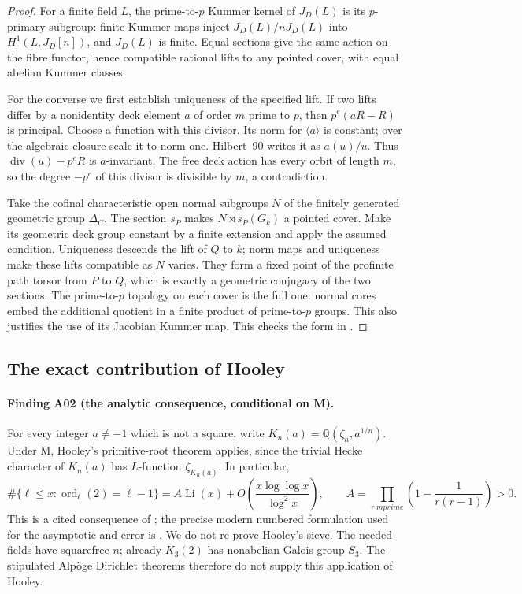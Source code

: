 \begin{proof}
For a finite field $L$, the prime-to-$p$ Kummer kernel of $J_D(L)$ is its
$p$-primary subgroup: finite Kummer maps inject $J_D(L)/nJ_D(L)$ into
$H^1(L,J_D[n])$, and $J_D(L)$ is finite. Equal sections give the same
action on the fibre functor, hence compatible rational lifts to any
pointed cover, with equal abelian Kummer classes.

For the converse we first establish uniqueness of the specified lift.
If two lifts differ by a nonidentity deck element $a$ of order $m$ prime
to $p$, then $p^e(aR-R)$ is principal. Choose a function with this
divisor. Its norm for $\langle a\rangle$ is constant; over the algebraic
closure scale it to norm one. Hilbert~90 writes it as $a(u)/u$.
Thus $\operatorname{div}(u)-p^eR$ is $a$-invariant. The free deck action
has every orbit of length $m$, so the degree $-p^e$ of this divisor is
divisible by $m$, a contradiction.

Take the cofinal characteristic open normal subgroups $N$ of the finitely
generated geometric group $\Delta_C$. The section $s_P$ makes
$N\rtimes s_P(G_k)$ a pointed cover. Make its geometric deck group
constant by a finite extension and apply the assumed condition.
Uniqueness descends the lift of $Q$ to $k$; norm maps and uniqueness
make these lifts compatible as $N$ varies. They form a fixed point of
the profinite path torsor from $P$ to $Q$, which is exactly a geometric
conjugacy of the two sections. The prime-to-$p$ topology on each cover
is the full one: normal cores embed the additional quotient in a finite
product of prime-to-$p$ groups. This also justifies the use of its
Jacobian Kummer map. This checks the form in \cite[A.31]{A1run}.
\end{proof}

\subsection{The exact contribution of Hooley}

\paragraph{Finding A02 (the analytic consequence, conditional on M).}
For every integer $a\ne-1$ which is not a square, write
$K_n(a)=\mathbb Q(\zeta_n,a^{1/n})$. Under M, Hooley's primitive-root
theorem applies, since the trivial Hecke character of $K_n(a)$ has
$L$-function $\zeta_{K_n(a)}$. In particular,
\[
 \#\{\ell\le x:\operatorname{ord}_{\ell}(2)=\ell-1\}
 = A\operatorname{Li}(x)
   +O\!\left(\frac{x\log\log x}{\log^2x}\right),\qquad
 A=\prod_{r\ {
m prime}}\left(1-\frac1{r(r-1)}\right)>0.
 \tag{A02}
\]
This is a cited consequence of \cite[\S7, concluding theorem]{Hooley}; the precise modern
numbered formulation used for the asymptotic and error is
\cite[Theorem~1.1, specialized to $a=2$]{FanPollack}. We do not re-prove
Hooley's sieve. The needed fields have squarefree $n$; already $K_3(2)$
has nonabelian Galois group $S_3$. The stipulated Alp\"oge Dirichlet
theorems therefore do not supply this application of Hooley.

